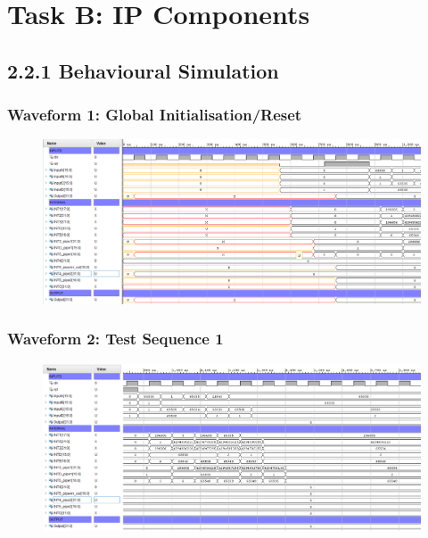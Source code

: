 \documentclass[11pt]{report}
\begin{document}
\chapter*{Task B: IP Components}

\section*{2.2.1 Behavioural Simulation}

\subsection*{Waveform 1: Global Initialisation/Reset}
\begin{figure}[H]
    \includegraphics[width=\columnwidth]{Reports/Lab3/Assets/2.2.1_waveform-initial-reset.png}
\end{figure}

\subsection*{Waveform 2: Test Sequence 1}
\begin{figure}[H]
    \includegraphics[width=\columnwidth]{Reports/Lab3/Assets/2.2.1_waveform-test-sequence-1.png}
\end{figure}
\end{document}
